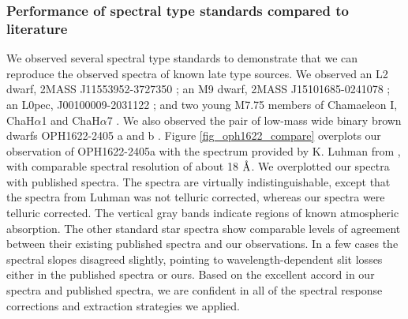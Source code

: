 \subsubsection{Performance of spectral type standards compared to literature}
We observed several spectral type standards to demonstrate that we can reproduce the observed spectra of known late type sources.  We observed an L2 dwarf, 2MASS J11553952-3727350 \citep{2008AJ....136.1290R}; an M9 dwarf, 2MASS J15101685-0241078 \citep{2008AJ....136.1290R}; an L0pec, J00100009-2031122 \citep{2007AJ....133..439C}; and two young M7.75 members of Chamaeleon I, ChaH$\alpha$1 and ChaH$\alpha$7 \citep{2004ApJ...602..816L}.  We also observed the pair of low-mass wide binary brown dwarfs OPH1622-2405 a and b \citep{2006PhDT.........2A,2007ApJ...659.1629L}.  Figure \ref{fig_oph1622_compare} overplots our observation of OPH1622-2405a with the spectrum provided by K. Luhman from \citet{2007ApJ...659.1629L}, with comparable spectral resolution of about 18 $\mbox{\normalfont\AA}$.  We overplotted our spectra with published spectra.  The spectra are virtually indistinguishable, except that the spectra from Luhman was not telluric corrected, whereas our spectra were telluric corrected.  The vertical gray bands indicate regions of known atmospheric absorption.  The other standard star spectra show comparable levels of agreement between their existing published spectra and our observations.  In a few cases the spectral slopes disagreed slightly, pointing to wavelength-dependent slit losses either in the published spectra or ours.  Based on the excellent accord in our spectra and published spectra, we are confident in all of the spectral response corrections and extraction strategies we applied.  

